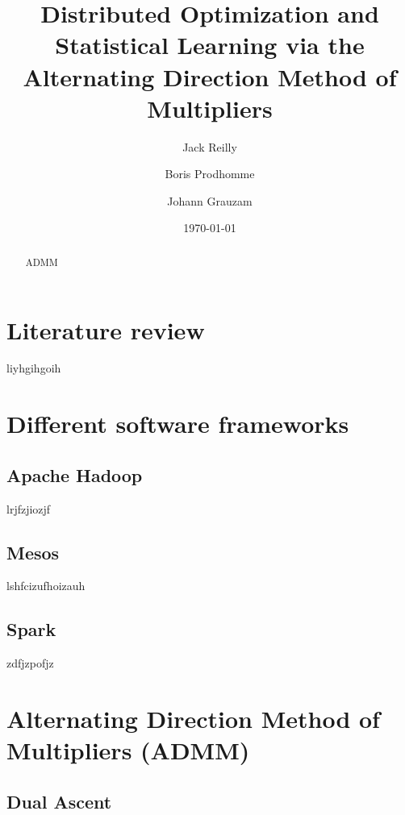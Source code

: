 \documentclass{article}
\begin{document}
\title{Distributed Optimization and Statistical Learning via the Alternating Direction Method of Multipliers}       
\author{Jack Reilly\and Boris Prodhomme\and Johann Grauzam\\ }       
\date{\today}         
\maketitle

\begin{abstract}

	ADMM \cite{ref1}
	
\end{abstract}

\section{Literature review}
 \label{Literature review}
 
	liyhgihgoih

\section{Different software frameworks}
 \label{Different software frameworks}

\subsection{Apache Hadoop}
	\label{Apache Hadoop}
	
	lrjfzjiozjf
	
\subsection{Mesos}
	\label{Mesos}
	
	lshfcizufhoizauh	
	
\subsection{Spark}
	\label{Spark}
	
	zdfjzpofjz


\section{Alternating Direction Method of Multipliers (ADMM)}
	\label{Alternating Direction Method of Multipliers (ADMM)}
	
\subsection{Dual Ascent}
	\label{Dual Ascent}
	
\end{document}
